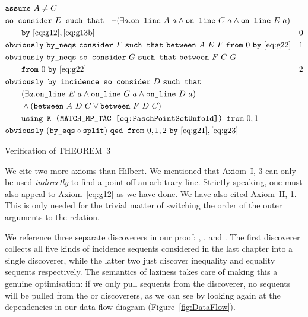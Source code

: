 \begin{boxedfigure}
  \begin{align*}
    &\code{assume}\ A\neq C\\
    &\code{so consider}\ E \code{ such that }\ \Triangle{a}{A}{C}{E}\\
    &\qquad\code{by}\ \eqref{eq:g12},\eqref{eq:g13b}& 0\\
    &\code{obviously}\ \code{by\_neqs}\ \code{consider}\ F\ \code{such that}\ \between{A}{E}{F}\ \code{from}\ 0\ \code{by}\ \eqref{eq:g22} & 1\\
    &\code{obviously}\ \code{by\_neqs}\ \code{so consider}\ G\ \code{such that}\ \between{F}{C}{G}\\&\qquad \code{from}\ 0\ \code{by}\ \eqref{eq:g22} & 2\\
    &\code{obviously by\_incidence so consider}\ D\ \code{such that}\\
    &\qquad(\exists a. \code{on\_line}\ E\ a \wedge \code{on\_line}\ G\ a \wedge \code{on\_line}\ D\ a)\\
    &\qquad \wedge (\between{A}{D}{C}\vee\between{F}{D}{C})\\
    &\qquad \code{using K (MATCH\_MP\_TAC \eqref{eq:PaschPointSetUnfold}) from}\ 0,1\\
    &\code{obviously}\ (\code{by\_eqs}\circ\code{split})\ \code{qed from}\ 0,1,2\ \code{by}\ \eqref{eq:g21},\eqref{eq:g23}
  \end{align*}
\caption{Verification of THEOREM~3}
\label{fig:ThreeVerification}
\end{boxedfigure}

We cite two more axioms than Hilbert. We mentioned that Axiom~I, 3 can only be used \emph{indirectly} to find a point off an arbitrary line. Strictly speaking, one must also appeal to Axiom~\ref{eq:g12} as we have done. We have also cited Axiom~II, 1. This is only needed for the trivial matter of switching the order of the outer arguments to the  relation. 

We reference three separate discoverers in our proof: , , and . The first discoverer collects all five kinds of incidence sequents considered in the last chapter into a single discoverer, while the latter two just discover inequality and equality sequents respectively. The semantics of laziness takes care of making this a genuine optimisation: if we only pull sequents from the  discoverer, no sequents will be pulled from the  or  discoverers, as we can see by looking again at the dependencies in our data-flow diagram (Figure~\ref{fig:DataFlow}).

